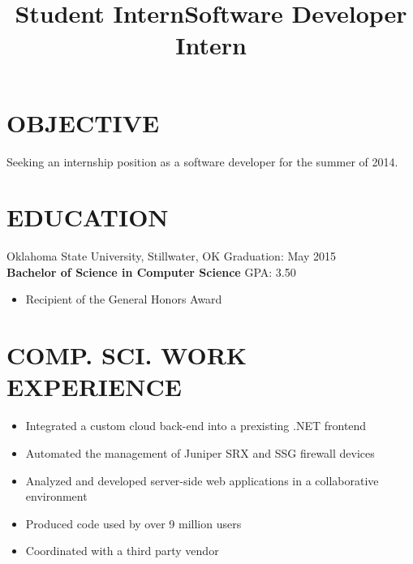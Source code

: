 \documentclass[line, overlapped]{res}
\begin{document}
\address{1875 Arbor Valley Dr \\ Edmond, OK 73025 \\ (405) 598-7827 \\ brandon@brandonsilver.com}

\begin{resume}

    \section{OBJECTIVE}
    Seeking an internship position as a software developer for the summer of 2014.

    \section{EDUCATION}
    Oklahoma State University, Stillwater, OK \hfill Graduation: May 2015 \\
    \textbf{Bachelor of Science in Computer Science} \hfill GPA: 3.50
    \begin{itemize}
        \item Recipient of the General Honors Award
    \end{itemize}

	\section{COMP. SCI. WORK EXPERIENCE} 

    \title{Student Intern}
    \begin{position}
        \begin{itemize}
            \item Integrated a custom cloud back-end into a prexisting .NET frontend
            \item Automated the management of Juniper SRX and SSG firewall devices
    \end{itemize}
    \end{position}

    \title{Software Developer Intern}
    \begin{position}
        \begin{itemize}
            \item Analyzed and developed server-side web applications in a collaborative environment
            \item Produced code used by over 9 million users
            \item Coordinated with a third party vendor
    \end{itemize}
    \end{position} 
 

\end{resume}
\end{document}
